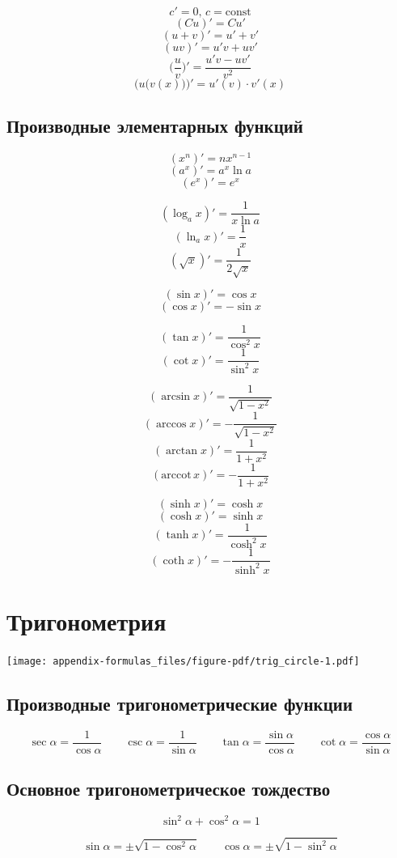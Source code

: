 \documentclass[
  letterpaper,
  DIV=11,
  numbers=noendperiod]{scrreprt}
\newcommand{\const}{\text{const}}
\theoremstyle{definition}
\theoremstyle{remark}
\begin{document}
\[c' = 0, \, c = \const\] \[(Cu)' = Cu'\] \[(u + v)' = u' + v'\]
\[(uv)' = u'v + uv'\]
\[\Big( \frac{u}{v} \Big)' = \frac{u'v - uv'}{v^2}\]
\[\Big(u\big(v(x)\big)\Big)' = u'(v) \cdot v'(x)\]

\subsection{Производные элементарных
функций}\label{formulas_deriv_funcs}

\[(x^n)' = nx^{n-1}\] \[(a^x)' = a^x \ln a\] \[(e^x)' = e^x\]

\[(\log_a x)' = \frac{1}{x \ln a}\] \[(\ln_a x)' = \frac{1}{x}\]
\[(\sqrt{x})' = \frac{1}{2\sqrt{x}}\]

\[(\sin x)' = \cos x\] \[(\cos x)' = -\sin x\]

\[(\tan x)' = \frac{1}{\cos^2 x}\] \[(\cot x)' = \frac{1}{\sin^2 x}\]

\[(\arcsin x)' = \frac{1}{\sqrt{1 - x^2}}\]
\[(\arccos x)' = -\frac{1}{\sqrt{1 - x^2}}\]
\[(\arctan x)' = \frac{1}{1 + x^2}\]
\[(\text{arccot}\, x)' = -\frac{1}{1 + x^2}\]

\[(\sinh x)' = \cosh x\] \[(\cosh x)' = \sinh x\]
\[(\tanh x)' = \frac{1}{\cosh^2 x}\]
\[(\coth x)' = -\frac{1}{\sinh^2 x}\]

\section{Тригонометрия}\label{formulas_trig}

\texttt{[image: appendix-formulas\_files/figure-pdf/trig\_circle-1.pdf]}

\subsection{Производные тригонометрические функции}\label{trig_funs_def}

\[
\sec \alpha = \frac{1}{\cos \alpha} \qquad
\csc \alpha = \frac{1}{\sin \alpha} \qquad
\tan \alpha = \frac{\sin \alpha}{\cos \alpha} \qquad
\cot \alpha = \frac{\cos \alpha}{\sin \alpha}
\]

\subsection{Основное тригонометрическое
тождество}\label{trig_pythagorean_identities}

\[
\sin^2 \alpha + \cos^2 \alpha = 1
\]

\[
\sin \alpha = \pm \sqrt{1 - \cos^2 \alpha} \qquad \cos \alpha = \pm \sqrt{1 - \sin^2 \alpha}
\]
\end{document}
